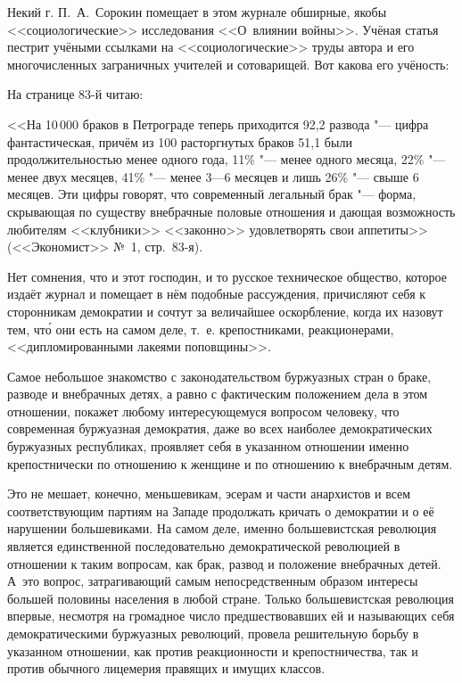 Некий г. П.~А.~Сорокин помещает в этом журнале обширные, якобы
<<социологические>> исследования <<О~влиянии войны>>. Учёная статья
пестрит учёными ссылками на <<социологические>> труды автора и его
многочисленных заграничных учителей и сотоварищей. Вот какова его учёность:

На странице 83-й читаю:

\medskip
{\small
<<На 10\,000 браков в Петрограде теперь приходится 92,2 развода "--- цифра
фантастическая, причём из 100 расторгнутых браков 51,1 были
продолжительностью менее одного года, 11\% "--- менее одного месяца,
22\% "--- менее двух месяцев, 41\% "--- менее 3---6 месяцев и лишь
26\% "--- свыше 6 месяцев. Эти цифры говорят, что современный легальный
брак "--- форма, скрывающая по существу внебрачные половые отношения и
дающая возможность любителям <<клубники>> <<законно>> удовлетворять свои
аппетиты>> (<<Экономист>> №~1, стр.~83-я).}
\medskip

Нет сомнения, что и этот господин, и то русское техническое общество,
которое издаёт журнал и помещает в нём подобные рассуждения, причисляют
себя к сторонникам демократии и сочтут за величайшее оскорбление, когда их
назовут тем, чт\'{о} они есть на самом деле, т.~е. крепостниками,
реакционерами, <<дипломированными лакеями поповщины>>.

Самое небольшое знакомство с законодательством буржуазных стран о браке,
разводе и внебрачных детях, а равно с фактическим положением дела в этом
отношении, покажет любому интересующемуся вопросом человеку, что
современная буржуазная демократия, даже во всех наиболее демократических
буржуазных республиках, проявляет себя в указанном отношении именно
крепостнически по отношению к женщине и по отношению к внебрачным детям.

Это не мешает, конечно, меньшевикам, эсерам и части анархистов и всем
соответствующим партиям на Западе продолжать кричать о демократии и о её
нарушении большевиками. На самом деле, именно большевистская революция
является единственной последовательно демократической революцией в отношении
к таким вопросам, как брак, развод и положение внебрачных детей. А~это
вопрос, затрагивающий самым непосредственным образом интересы большей
половины населения в любой стране. Только большевистская революция впервые,
несмотря на громадное число предшествовавших ей и называющих себя
демократическими буржуазных революций, провела решительную борьбу в
указанном отношении, как против реакционности и крепостничества, так и
против обычного лицемерия правящих и имущих классов.


